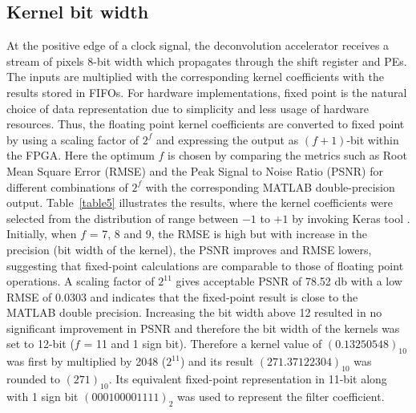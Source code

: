 \documentclass[journal]{IEEEtran}
\begin{document}
\subsection{Kernel bit width}\label{sec:About kernel}
At the positive edge of a clock signal, the deconvolution accelerator receives a stream of pixels 8-bit width which propagates through the shift register and PEs. The inputs are multiplied with the corresponding kernel coefficients with the results stored in FIFOs. For hardware implementations, fixed point is the natural choice of data representation due to simplicity and less usage of hardware resources. Thus, the floating point kernel coefficients are converted to fixed point by using a scaling factor of $2^f$ and expressing the output as $(f+1)$-bit within the FPGA. Here the optimum $f$ is chosen by comparing the metrics such as Root Mean Square Error (RMSE) and the Peak Signal to Noise Ratio (PSNR) for different combinations of $2^f$  with the corresponding MATLAB double-precision output. Table~\ref{table5} illustrates the results, where the kernel coefficients were selected from the distribution of range between $-1$ to $+1$ by invoking Keras tool \cite{article24}. Initially, when $f$ = 7, 8 and 9, the RMSE is high but with increase in the precision (bit width of the kernel), the PSNR improves and RMSE lowers, suggesting that fixed-point calculations are comparable to those of floating point operations. A scaling factor of $2^{11}$ gives acceptable PSNR of 78.52 db  \cite{article21} with a low RMSE of 0.0303 and indicates that the fixed-point result is close to the MATLAB double precision. Increasing the bit width above 12 resulted in no significant improvement in PSNR  and therefore the bit width of the kernels was set to 12-bit ($f$ = 11 and 1 sign bit). Therefore a kernel value of $(0.13250548)_{10}$ was first by multiplied by 2048 ($2^{11}$) and its result $(271.37122304)_{10}$ was rounded to $(271)_{10}$. Its equivalent fixed-point representation in 11-bit along with 1 sign bit $(000100001111)_2$  was used to represent the filter coefficient. 
\end{document}

